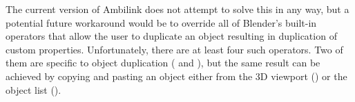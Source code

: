 The current version of Ambilink does not attempt to solve this in any way, but a potential future workaround 
would be to override all of Blender's built-in operators that allow the user to duplicate an object 
resulting in duplication of custom properties. Unfortunately, there are at least four such operators.
Two of them
are specific to object duplication ( and ), 
but the same result can be achieved by copying and pasting an object 
either from the 3D viewport () 
or the object list ().
